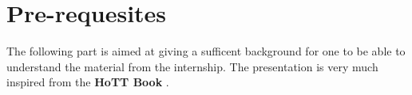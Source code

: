 \documentclass{report}
\makeatletter
\renewcommand\paragraph{\@startsection{paragraph}{5}{\z@}%
  {3.25ex \@plus1ex \@minus.2ex}%
  {-1em}%
  {\normalfont\normalsize\bfseries}}
\makeatother
\begin{document}
\chapter{Pre-requesites}
The following part is aimed at giving a sufficent background for one to be able to understand the material from the internship. The presentation is very much inspired from the \textbf{HoTT Book} \cite{hott}. 

\end{document}
